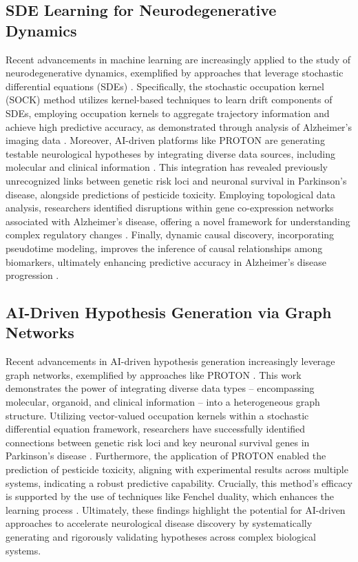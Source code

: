 \documentclass[11pt,a4paper]{article}
\begin{document}
\subsection{SDE Learning for Neurodegenerative Dynamics}
Recent advancements in machine learning are increasingly applied to the study of neurodegenerative dynamics, exemplified by approaches that leverage stochastic differential equations (SDEs) \cite{arxiv250511622}.  Specifically, the stochastic occupation kernel (SOCK) method utilizes kernel-based techniques to learn drift components of SDEs, employing occupation kernels to aggregate trajectory information and achieve high predictive accuracy, as demonstrated through analysis of Alzheimer's imaging data \cite{arxiv250511622}.  Moreover, AI-driven platforms like PROTON are generating testable neurological hypotheses by integrating diverse data sources, including molecular and clinical information \cite{arxiv251213724}.  This integration has revealed previously unrecognized links between genetic risk loci and neuronal survival in Parkinson’s disease, alongside predictions of pesticide toxicity.  Employing topological data analysis, researchers identified disruptions within gene co-expression networks associated with Alzheimer’s disease, offering a novel framework for understanding complex regulatory changes \cite{arxiv251118238}.  Finally, dynamic causal discovery, incorporating pseudotime modeling, improves the inference of causal relationships among biomarkers, ultimately enhancing predictive accuracy in Alzheimer’s disease progression \cite{arxiv251104619}.

\subsection{AI-Driven Hypothesis Generation via Graph Networks}
Recent advancements in AI-driven hypothesis generation increasingly leverage graph networks, exemplified by approaches like PROTON \cite{arxiv251213724}. This work demonstrates the power of integrating diverse data types – encompassing molecular, organoid, and clinical information – into a heterogeneous graph structure. Utilizing vector-valued occupation kernels within a stochastic differential equation framework, researchers have successfully identified connections between genetic risk loci and key neuronal survival genes in Parkinson’s disease \cite{arxiv251213724}.  Furthermore, the application of PROTON enabled the prediction of pesticide toxicity, aligning with experimental results across multiple systems, indicating a robust predictive capability.  Crucially, this method’s efficacy is supported by the use of techniques like Fenchel duality, which enhances the learning process \cite{arxiv250511622}.  Ultimately, these findings highlight the potential for AI-driven approaches to accelerate neurological disease discovery by systematically generating and rigorously validating hypotheses across complex biological systems.
\end{document}
